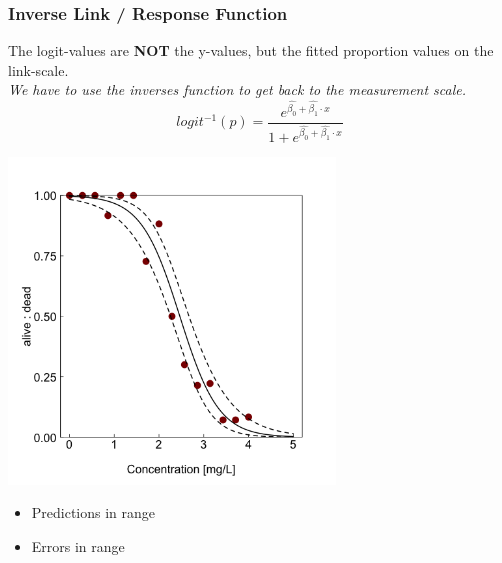 \documentclass{beamer}
\begin{document}
\begin{frame}[fragile]
    \frametitle{Inverse Link / Response Function}
    \large
    The logit-values are \textbf{NOT} the y-values, but the fitted proportion values on the link-scale.\\
    \textit{We have to use the  inverses function to get back to the measurement scale.}
    \[
    logit^{-1}(p) = \frac{e^{\hat{\beta_0} + \hat{\beta_1} \cdot x}}{1 + e^{\hat{\beta_0} + \hat{\beta_1} \cdot x}}
    \]
\end{frame}

\begin{frame}
    \begin{center}
    \includegraphics[width=0.65\textwidth]{lectures/day_9_refreshing_glm/figures/unnamed-chunk-18-1.png}
    \end{center}
    \begin{itemize}
    \centering
        \item Predictions in range
        \item Errors in range
    \end{itemize}
\end{frame}
\end{document}
